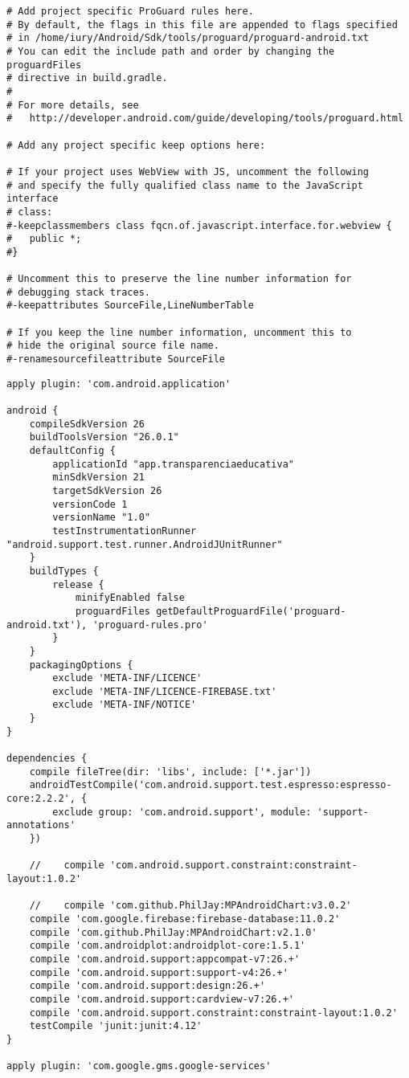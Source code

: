 \documentclass[12pt,a4paper]{article}
\begin{document}
\begin{lstlisting}[caption=./mobile/proguard-rules.pro]
# Add project specific ProGuard rules here.
# By default, the flags in this file are appended to flags specified
# in /home/iury/Android/Sdk/tools/proguard/proguard-android.txt
# You can edit the include path and order by changing the proguardFiles
# directive in build.gradle.
#
# For more details, see
#   http://developer.android.com/guide/developing/tools/proguard.html

# Add any project specific keep options here:

# If your project uses WebView with JS, uncomment the following
# and specify the fully qualified class name to the JavaScript interface
# class:
#-keepclassmembers class fqcn.of.javascript.interface.for.webview {
#   public *;
#}

# Uncomment this to preserve the line number information for
# debugging stack traces.
#-keepattributes SourceFile,LineNumberTable

# If you keep the line number information, uncomment this to
# hide the original source file name.
#-renamesourcefileattribute SourceFile
\end{lstlisting}
\pagebreak

\begin{lstlisting}[caption=./mobile/build.gradle]
apply plugin: 'com.android.application'

android {
    compileSdkVersion 26
    buildToolsVersion "26.0.1"
    defaultConfig {
        applicationId "app.transparenciaeducativa"
        minSdkVersion 21
        targetSdkVersion 26
        versionCode 1
        versionName "1.0"
        testInstrumentationRunner "android.support.test.runner.AndroidJUnitRunner"
    }
    buildTypes {
        release {
            minifyEnabled false
            proguardFiles getDefaultProguardFile('proguard-android.txt'), 'proguard-rules.pro'
        }
    }
    packagingOptions {
        exclude 'META-INF/LICENCE'
        exclude 'META-INF/LICENCE-FIREBASE.txt'
        exclude 'META-INF/NOTICE'
    }
}

dependencies {
    compile fileTree(dir: 'libs', include: ['*.jar'])
    androidTestCompile('com.android.support.test.espresso:espresso-core:2.2.2', {
        exclude group: 'com.android.support', module: 'support-annotations'
    })

    //    compile 'com.android.support.constraint:constraint-layout:1.0.2'

    //    compile 'com.github.PhilJay:MPAndroidChart:v3.0.2'
    compile 'com.google.firebase:firebase-database:11.0.2'
    compile 'com.github.PhilJay:MPAndroidChart:v2.1.0'
    compile 'com.androidplot:androidplot-core:1.5.1'
    compile 'com.android.support:appcompat-v7:26.+'
    compile 'com.android.support:support-v4:26.+'
    compile 'com.android.support:design:26.+'
    compile 'com.android.support:cardview-v7:26.+'
    compile 'com.android.support.constraint:constraint-layout:1.0.2'
    testCompile 'junit:junit:4.12'
}

apply plugin: 'com.google.gms.google-services'
\end{lstlisting}
\pagebreak
\end{document}
